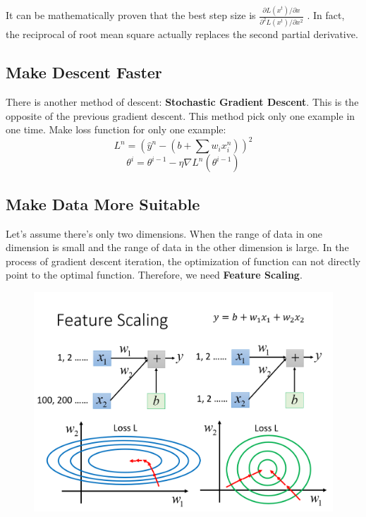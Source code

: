\documentclass{article}
\begin{document}
It can be mathematically proven that the best step size is $\frac{\partial L(x^t)/\partial x}{\partial^2 L(x^t)/\partial x^2}$ . In fact, the reciprocal of root mean square actually replaces the second partial derivative.

\subsection{Make Descent Faster}

There is another method of descent: \textbf{Stochastic Gradient Descent}. This is the opposite of the previous gradient descent. This method pick only one example in one time. Make loss function for only one example:
$$
L^n=\left(\hat{y}^n-\left(b+\sum w_ix_i^n\right)\right)^2
$$
$$
\theta^i=\theta^{i-1}-\eta\nabla L^n{\left(\theta^{i-1}\right)}
$$

\subsection{Make Data More Suitable}

Let's assume there's only two dimensions. When the range of data in one dimension is small and the range of data in the other dimension is large. In the process of gradient descent iteration, the optimization of function can not directly point to the optimal function. Therefore, we need \textbf{Feature Scaling}. 

\begin{figure}[htbp]
  \centering
  \includegraphics[scale=0.5]{pic/Feature Scaling.png}
  \label{fig:my_label}
\end{figure}
\end{document}
